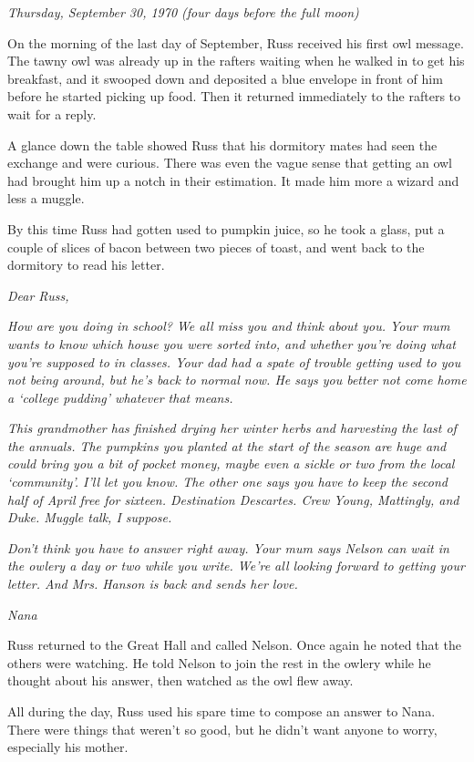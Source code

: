 \documentclass[a4paper,11pt]{article}
\begin{document}
\emph{Thursday, September 30, 1970 (four days before the full moon)}

On the morning of the last day of September, Russ received his first owl message. The tawny owl was already up in the rafters waiting when he walked in to get his breakfast, and it swooped down and deposited a blue envelope in front of him before he started picking up food. Then it returned immediately to the rafters to wait for a reply.

A glance down the table showed Russ that his dormitory mates had seen the exchange and were curious. There was even the vague sense that getting an owl had brought him up a notch in their estimation. It made him more a wizard and less a muggle.

By this time Russ had gotten used to pumpkin juice, so he took a glass, put a couple of slices of bacon between two pieces of toast, and went back to the dormitory to read his letter.

\emph{Dear Russ,}

\emph{How are you doing in school? We all miss you and think about you. Your mum wants to know which house you were sorted into, and whether you're doing what you're supposed to in classes. Your dad had a spate of trouble getting used to you not being around, but he's back to normal now. He says you better not come home a `college pudding' whatever that means.}

\emph{This grandmother has finished drying her winter herbs and harvesting the last of the annuals. The pumpkins you planted at the start of the season are huge and could bring you a bit of pocket money, maybe even a sickle or two from the local `community'. I'll let you know. The other one says you have to keep the second half of April free for sixteen. Destination Descartes. Crew Young, Mattingly, and Duke. Muggle talk, I suppose.}

\emph{Don't think you have to answer right away. Your mum says Nelson can wait in the owlery a day or two while you write. We're all looking forward to getting your letter. And Mrs. Hanson is back and sends her love.}

\emph{Nana}

Russ returned to the Great Hall and called Nelson. Once again he noted that the others were watching. He told Nelson to join the rest in the owlery while he thought about his answer, then watched as the owl flew away.

All during the day, Russ used his spare time to compose an answer to Nana. There were things that weren't so good, but he didn't want anyone to worry, especially his mother.
\end{document}
